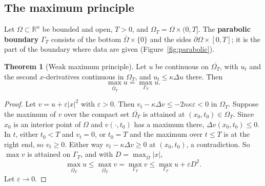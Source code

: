 \documentclass[11pt,a4paper]{article}
\numberwithin{equation}{section}
\theoremstyle{definition}
\newtheorem{thm}{Theorem}[subsection]
\begin{document}
\subsection{The maximum principle}
\label{ssec:maxprinciple}

Let $\Omega \subset \mathbb R^n$ be bounded and open, $T > 0$, and $\Omega_T = \Omega \times (0, T]$. The \textbf{parabolic boundary} $\Gamma_T$ consists of the bottom $\overline\Omega \times \{0\}$ and the sides $\partial\Omega \times [0, T]$; it is the part of the boundary where data are given (Figure~\ref{fig:parabolic}).

\begin{thm}[Weak maximum principle]
\label{thm:maxheat}
Let $u$ be continuous on $\overline{\Omega_T}$, with $u_t$ and the second $x$-derivatives continuous in $\Omega_T$, and $u_t \leq \kappa\Delta u$ there. Then
\[
\max_{\overline{\Omega_T}}u = \max_{\Gamma_T}u .
\]
\end{thm}

\begin{proof}
Let $v = u + \varepsilon|x|^2$ with $\varepsilon > 0$. Then $v_t - \kappa\Delta v \leq -2n\kappa\varepsilon < 0$ in $\Omega_T$. Suppose the maximum of $v$ over the compact set $\overline{\Omega_T}$ is attained at $(x_0, t_0) \in \Omega_T$. Since $x_0$ is an interior point of $\Omega$ and $v(\cdot, t_0)$ has a maximum there, $\Delta v(x_0, t_0) \leq 0$.
In $t$, either $t_0 < T$ and $v_t = 0$, or $t_0 = T$ and the maximum over $t \leq T$ is at the right end, so $v_t \geq 0$. Either way $v_t - \kappa\Delta v \geq 0$ at $(x_0, t_0)$, a contradiction. So $\max v$ is attained on $\Gamma_T$, and with $D = \max_{\overline\Omega}|x|$,
\[
\max_{\overline{\Omega_T}}u \leq \max_{\overline{\Omega_T}}v = \max_{\Gamma_T}v \leq \max_{\Gamma_T}u + \varepsilon D^2 .
\]
Let $\varepsilon \to 0$.
\end{proof}
\end{document}
